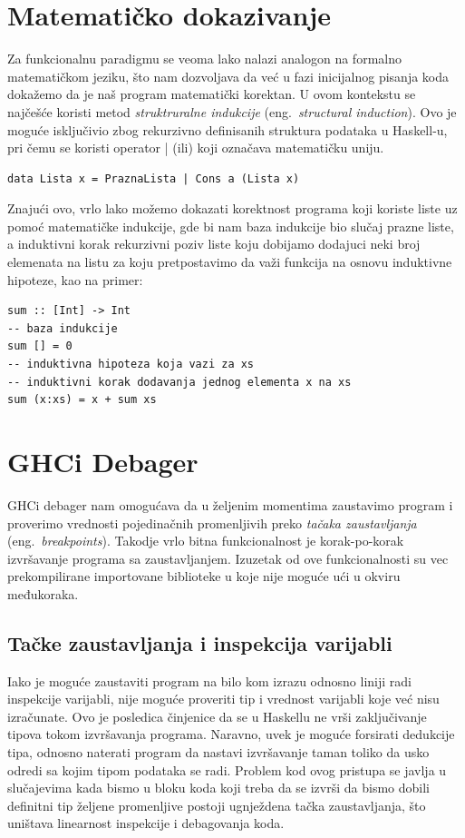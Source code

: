 \documentclass[a4paper]{article}
\begin{document}
\section{Matematičko dokazivanje}

Za funkcionalnu paradigmu se veoma lako nalazi analogon na formalno matematičkom jeziku, što nam dozvoljava da već u fazi inicijalnog pisanja koda dokažemo da je naš program matematički korektan. U ovom kontekstu se najčešće koristi metod {\em struktruralne indukcije}  (eng.~{\em structural induction}). Ovo je moguće isključivio zbog rekurzivno definisanih struktura podataka u Haskell-u, pri čemu se koristi operator | (ili) koji označava matematičku uniju.
\begin{lstlisting}[caption={Rekurzivno definisanje liste u Haskellu},frame=single, label=simple]
data Lista x = PraznaLista | Cons a (Lista x)
\end{lstlisting}
Znajući ovo, vrlo lako možemo dokazati korektnost programa koji koriste liste uz pomoć matematičke indukcije, gde bi nam baza indukcije bio slučaj prazne liste, a induktivni korak rekurzivni poziv liste koju dobijamo dodajuci neki broj elemenata na listu za koju pretpostavimo da važi funkcija na osnovu induktivne hipoteze, kao na primer:
\begin{lstlisting}[caption={Primer rekurzivno definisane funkcije},frame=single, label=simple]
sum :: [Int] -> Int
-- baza indukcije
sum [] = 0
-- induktivna hipoteza koja vazi za xs
-- induktivni korak dodavanja jednog elementa x na xs
sum (x:xs) = x + sum xs 
\end{lstlisting}


\section{GHCi Debager}
GHCi debager nam omogućava da u željenim momentima zaustavimo program i proverimo vrednosti pojedinačnih promenljivih preko {\em tačaka zaustavljanja} (eng.~{\em breakpoints}). Takodje vrlo bitna funkcionalnost je korak-po-korak izvršavanje programa sa zaustavljanjem. Izuzetak od ove funkcionalnosti su vec prekompilirane importovane biblioteke u koje nije moguće ući u okviru međukoraka.


\subsection{Tačke zaustavljanja i inspekcija varijabli}
Iako je moguće zaustaviti program na bilo kom izrazu odnosno liniji radi inspekcije varijabli, nije moguće proveriti tip i vrednost varijabli koje već nisu izračunate. Ovo je posledica činjenice da se u Haskellu ne vrši zaključivanje tipova tokom izvršavanja programa. Naravno, uvek je moguće forsirati dedukcije tipa, odnosno naterati program da nastavi izvršavanje taman toliko da usko odredi sa kojim tipom podataka se radi. Problem kod ovog pristupa se javlja u slučajevima kada bismo u bloku koda koji treba da se izvrši da bismo dobili definitni tip željene promenljive postoji ugnježdena tačka zaustavljanja, što uništava linearnost inspekcije i debagovanja koda. 
\end{document}
